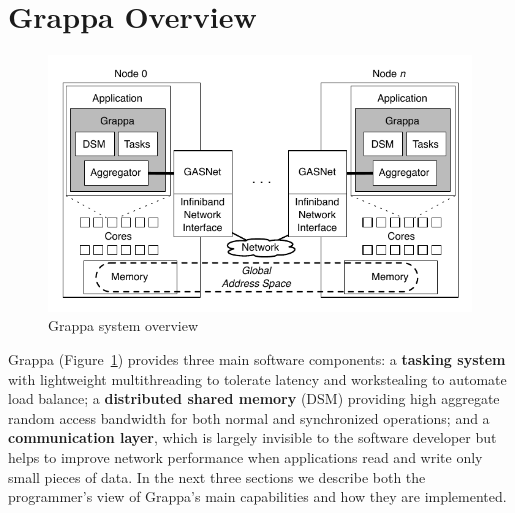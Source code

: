 \section{Grappa Overview}

\begin{figure}[t]
\begin{center}
  \includegraphics[width=0.95\columnwidth]{figs/system-overview}
\begin{minipage}{0.95\columnwidth}
  \caption{\label{fig:grappa} Grappa system overview}
\end{minipage}
\vspace{-3ex}
\end{center}
\end{figure}


Grappa (Figure~\ref{fig:grappa}) provides three main software components:
a \textbf{tasking system} with lightweight multithreading to tolerate
latency and workstealing to automate load balance;
a \textbf{distributed shared memory} (DSM) providing high aggregate
random access bandwidth for both normal and synchronized operations;
and a \textbf{communication layer}, which is largely invisible to the software developer but helps to improve network performance when applications read and write only small pieces of data.
In the next three sections we describe both the programmer's view of Grappa's main capabilities and how they are implemented.


